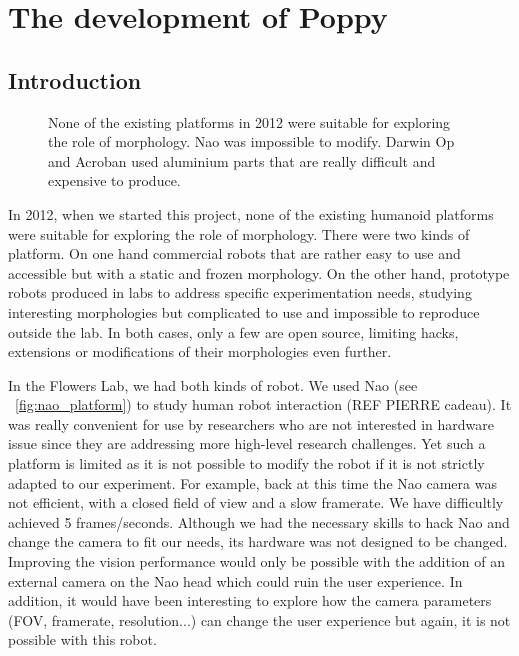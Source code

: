 
\cleartoleftpage

\chapter{The development of Poppy} %
\label{cha:poppy-dev}

\section{Introduction} %

\begin{figure}[tb]
\centering
    \hfil
    \hfil
    \caption{None of the existing platforms in 2012 were suitable for exploring the role of morphology. Nao was impossible to modify. Darwin Op and Acroban used aluminium parts that are really difficult and expensive to produce.}
    \label{fig:2012_Humanoids}
\end{figure}

In 2012, when we started this project, none of the existing humanoid platforms were suitable for exploring the role of morphology. There were two kinds of platform. On one hand commercial robots that are rather easy to use and accessible but with a static and frozen morphology. On the other hand, prototype robots produced in labs to address specific experimentation needs, studying interesting morphologies but complicated to use and impossible to reproduce outside the lab. In both cases, only a few are open source, limiting hacks, extensions or modifications of their morphologies even further.

In the Flowers Lab, we had both kinds of robot. We used Nao (see \figurename~\ref{fig:nao_platform}) to study human robot interaction (REF PIERRE cadeau). It was really convenient for use by researchers who are not interested in hardware issue since they are addressing more high-level research challenges. Yet such a platform is limited as it is not possible to modify the robot if it is not strictly adapted to our experiment. For example, back at this time the Nao camera was not efficient, with a closed field of view and a slow framerate. We have difficultly achieved 5 frames/seconds. Although we had the necessary skills to hack Nao and change the camera to fit our needs, its hardware was not designed to be changed. Improving the vision performance would only be possible with the addition of an external camera on the Nao head which could ruin the user experience. In addition, it would have been interesting to explore how the camera parameters (FOV, framerate, resolution...) can change the user experience but again, it is not possible with this robot.


